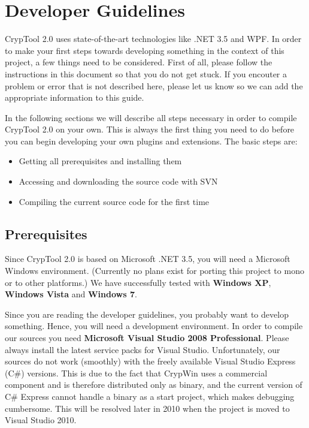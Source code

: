 \chapter{Developer Guidelines}
\label{DeveloperGuidelines}

CrypTool 2.0 uses state-of-the-art technologies like .NET 3.5 and WPF. In order to make your first steps towards developing something in the context of this project, a few things need to be considered. First of all, please follow the instructions in this document so that you do not get stuck. If you encouter a problem or error that is not described here, please let us know so we can add the appropriate information to this guide.

In the following sections we will describe all steps necessary in order to compile CrypTool 2.0 on your own. This is always the first thing you need to do before you can begin developing your own plugins and extensions. The basic steps are:
\begin{itemize}
	\item Getting all prerequisites and installing them
	\item Accessing and downloading the source code with SVN
	\item Compiling the current source code for the first time
\end{itemize}

\section{Prerequisites}
\label{Prerequisites}

Since CrypTool 2.0 is based on Microsoft .NET 3.5, you will need a Microsoft Windows environment. (Currently no plans exist for porting this project to mono or to other platforms.) We have successfully tested with \textbf{Windows XP}, \textbf{Windows Vista} and \textbf{Windows 7}.

Since you are reading the developer guidelines, you probably want to develop something. Hence, you will need a development environment. In order to compile our sources you need \textbf{Microsoft Visual Studio 2008 Professional}. Please always install the latest service packs for Visual Studio. Unfortunately, our sources do not work (smoothly) with the freely available Visual Studio Express (C\#) versions. This is due to the fact that CrypWin uses a commercial component and is therefore distributed only as binary, and the current version of C\# Express cannot handle a binary as a start project, which makes debugging cumbersome. This will be resolved later in 2010 when the project is moved to Visual Studio 2010.

